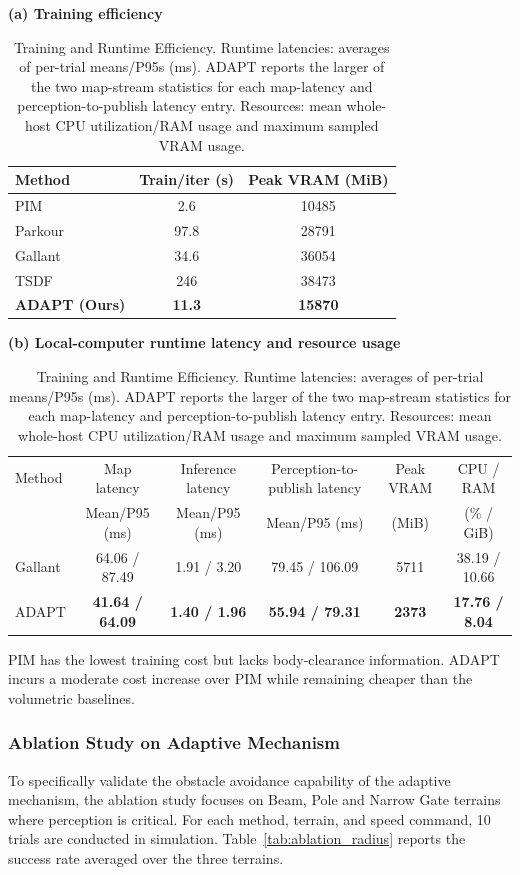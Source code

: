\begin{table}[t]
\centering
\caption{Training and Runtime Efficiency. Runtime latencies: averages of per-trial means/P95s (ms). ADAPT reports the larger of the two map-stream statistics for each map-latency and perception-to-publish latency entry. Resources: mean whole-host CPU utilization/RAM usage and maximum sampled VRAM usage.}
\label{tab:efficiency}
\small
\setlength{\tabcolsep}{6pt}
\textbf{(a) Training efficiency}\\[3pt]
\begin{tabular}{lcc}
\toprule[1.0pt]
Method & Train/iter (s) & Peak VRAM (MiB) \\
\midrule[0.8pt]
PIM~\cite{long2025learning} & 2.6 & 10485 \\
Parkour~\cite{zhuang2024humanoid} & 97.8 & 28791 \\
Gallant~\cite{Ben_2025_Gallant} & 34.6 & 36054 \\
TSDF & 246 & 38473 \\
\textbf{ADAPT (Ours)} & \textbf{11.3} & \textbf{15870} \\
\bottomrule[1.0pt]
\end{tabular}
\par\vspace{6pt}
\textbf{(b) Local-computer runtime latency and resource usage}\\[3pt]
\setlength{\tabcolsep}{4pt}
\begin{tabular}{lccccc}
\toprule[1.0pt]
Method & Map latency & Inference latency & Perception-to-publish latency & Peak VRAM & CPU / RAM \\
 & Mean/P95 (ms) & Mean/P95 (ms) & Mean/P95 (ms) & (MiB) & (\% / GiB) \\
\midrule[0.8pt]
Gallant & 64.06 / 87.49 & 1.91 / 3.20 & 79.45 / 106.09 & 5711 & 38.19 / 10.66 \\
ADAPT & \textbf{41.64 / 64.09} & \textbf{1.40 / 1.96} & \textbf{55.94 / 79.31} & \textbf{2373} & \textbf{17.76 / 8.04} \\
\bottomrule[1.0pt]
\end{tabular}
\end{table}

PIM has the lowest training cost but lacks body-clearance information. ADAPT incurs a moderate cost increase over PIM while remaining cheaper than the volumetric baselines.

\subsubsection{Ablation Study on Adaptive Mechanism}
To specifically validate the obstacle avoidance capability of the adaptive mechanism, the ablation study focuses on Beam, Pole and Narrow Gate terrains where perception is critical. For each method, terrain, and speed command, 10 trials are conducted in simulation. Table~\ref{tab:ablation_radius} reports the success rate averaged over the three terrains.

